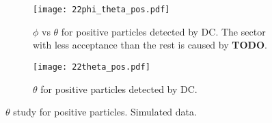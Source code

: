     \begin{figure}
        \centering
        \begin{subfigure}[b]{\textwidth}
            \centering
            \texttt{[image: 22phi\_theta\_pos.pdf]}
            \caption[$\phi$ vs $\theta$ for positive particles]
            {$\phi$ vs $\theta$ for positive particles detected by DC.
            The sector with less acceptance than the rest is caused by \textbf{TODO}.}
            \label{fig::14.22::phi_theta_pos}
        \end{subfigure}
        \begin{subfigure}[b]{\textwidth}
            \centering
            \texttt{[image: 22theta\_pos.pdf]}
            \caption[$\theta$ for positive particles]
            {$\theta$ for positive particles detected by DC.}
            \label{fig::14.22::theta_pos}
        \end{subfigure}
        \caption[$\theta$ study for positive particles]
        {$\theta$ study for positive particles.
        Simulated data.}
        \label{fig::14.22::theta_study_pos}
    \end{figure}
